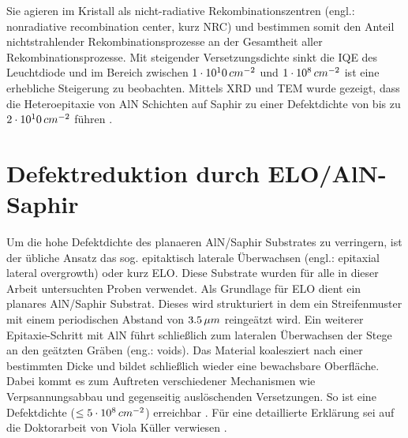 \noindent
%
Sie agieren im Kristall als nicht-radiative Rekombinationszentren (engl.: nonradiative recombination center, kurz NRC) und bestimmen somit den Anteil nichtstrahlender Rekombinationsprozesse an der Gesamtheit aller Rekombinationsprozesse. Mit steigender Versetzungsdichte sinkt die IQE des Leuchtdiode und im Bereich zwischen $1\cdot 10^10 \thinspace cm^{-2}$ und $1\cdot 10^8 \thinspace cm^{-2}$ ist eine erhebliche Steigerung zu beobachten. Mittels XRD und TEM wurde gezeigt, dass die Heteroepitaxie von AlN Schichten auf Saphir zu einer Defektdichte von bis zu $2\cdot 10^10 \thinspace cm^{-2}$ führen \cite{zeimeru}.

\section{Defektreduktion durch ELO/AlN-Saphir}

Um die hohe Defektdichte des planaeren AlN/Saphir Substrates zu verringern, ist der übliche Ansatz das sog. epitaktisch laterale Überwachsen (engl.: epitaxial lateral overgrowth) oder kurz ELO. Diese Substrate wurden für alle in dieser Arbeit untersuchten Proben verwendet. 
Als Grundlage für ELO dient ein planares AlN/Saphir Substrat. Dieses wird strukturiert in dem ein Streifenmuster mit einem periodischen Abstand von $3.5 \thinspace \mu m$ reingeätzt wird. Ein weiterer Epitaxie-Schritt mit AlN führt schließlich zum lateralen Überwachsen der Stege an den geätzten Gräben (eng.: voids).
Das Material koalesziert nach einer bestimmten Dicke und bildet schließlich wieder eine bewachsbare Oberfläche. Dabei kommt es zum Auftreten verschiedener Mechanismen wie Verpsannungsabbau und gegenseitig auslöschenden Versetzungen. So ist eine Defektdichte ($\leq 5 \cdot 10^8 \thinspace cm^{-2}$) erreichbar \cite{zeimeru} \cite{MOGILATENKO2014222} \cite{vkueller} \cite{IMURA2007257}. Für eine detaillierte Erklärung sei auf die Doktorarbeit von Viola Küller verwiesen \cite{vkueller}.